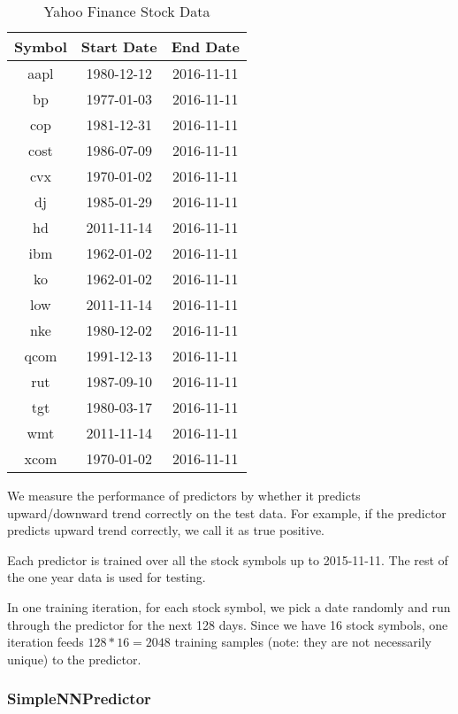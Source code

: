 \documentclass[twocolumn,10pt]{asme2ej}
\begin{document}
\begin{table}
  \begin{tabular}{ccc}
    Symbol & Start Date & End Date \\
    \hline
    aapl & 1980-12-12 & 2016-11-11 \\
    bp & 1977-01-03 & 2016-11-11 \\
    cop & 1981-12-31 & 2016-11-11 \\
    cost & 1986-07-09 & 2016-11-11 \\
    cvx & 1970-01-02 & 2016-11-11 \\
    dj & 1985-01-29 & 2016-11-11 \\
    hd & 2011-11-14 & 2016-11-11 \\
    ibm & 1962-01-02 & 2016-11-11 \\
    ko & 1962-01-02 & 2016-11-11 \\
    low & 2011-11-14 & 2016-11-11 \\
    nke & 1980-12-02 & 2016-11-11 \\
    qcom & 1991-12-13 & 2016-11-11 \\
    rut & 1987-09-10 & 2016-11-11 \\
    tgt & 1980-03-17 & 2016-11-11 \\
    wmt & 2011-11-14 & 2016-11-11 \\
    xcom & 1970-01-02 & 2016-11-11 \\
  \end{tabular}
  \caption{Yahoo Finance Stock Data}
  \label{yahooStockData}
\end{table}


We measure the performance of predictors by whether it predicts
upward/downward trend correctly on the test data. For example, if the
predictor predicts upward trend correctly, we call it as true
positive. 

Each predictor is trained over all the stock symbols up to
2015-11-11. The rest of the one year data is used for testing.

In one training iteration, for each stock symbol, we pick a date
randomly and run through the predictor for the next 128 days. Since we
have 16 stock symbols, one iteration feeds $128 * 16 = 2048$ training
samples (note: they are not necessarily unique) to the predictor.


\subsubsection{SimpleNNPredictor}
\end{document}
